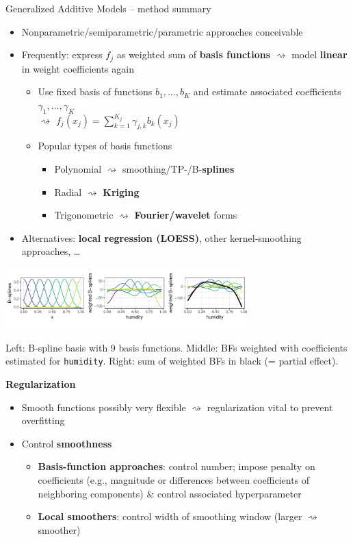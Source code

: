 \documentclass[11pt,compress,t,notes=noshow, xcolor=table]{beamer}
\newcommand{\highlight}[1]{\textcolor{hlcol}{\textbf{#1}}}
\begin{document}
\begin{frame2}{Generalized Additive Models -- method summary}
\begin{itemize}
  \item Nonparametric/semiparametric/parametric approaches conceivable
  \item Frequently: express $f_j$ as weighted sum of \textbf{basis functions}
  $\rightsquigarrow$ model \textbf{linear} in weight coefficients again
  \begin{itemize}
      \item Use fixed basis of functions $b_1, \dots, b_K$ and estimate
      associated coefficients $\gamma_1, \dots, \gamma_K$ \\ $\rightsquigarrow$
      $f_j(x_j) = \textstyle \sum_{k=1}^{K_j} \gamma_{j, k} b_k(x_j)$
      \item Popular types of basis functions
      \begin{itemize}
        \footnotesize
        \item Polynomial $\rightsquigarrow$ smoothing/TP-/B-\textbf{splines}
        \item Radial $\rightsquigarrow$ \textbf{Kriging}
        \item Trigonometric $\rightsquigarrow$ \textbf{Fourier/wavelet} forms
      \end{itemize}
    \end{itemize}
    \item Alternatives: \textbf{local regression (LOESS)}, other
    kernel-smoothing approaches, \dots
\end{itemize}

\includegraphics[width=0.7\textwidth]{figure/gam_bike_spline_basis}

\tiny
Left: B-spline basis with 9 basis functions.
Middle: BFs weighted with coefficients estimated for
\texttt{humidity}.
Right: sum of weighted BFs in black (= partial effect).

\framebreak
\highlight{Regularization}
\begin{itemize}
    \item Smooth functions possibly very flexible $\rightsquigarrow$
    regularization vital to prevent overfitting
    \item Control \textbf{smoothness}
    \begin{itemize}
      \item \textbf{Basis-function approaches}: control number; impose penalty
      on coefficients
      (e.g., magnitude or differences between coefficients of neighboring
      components) \& control associated hyperparameter
      \item \textbf{Local smoothers}: control width of smoothing window
      (larger $\rightsquigarrow$ smoother)
    \end{itemize}
\end{itemize}


\end{frame2}
\end{document}
